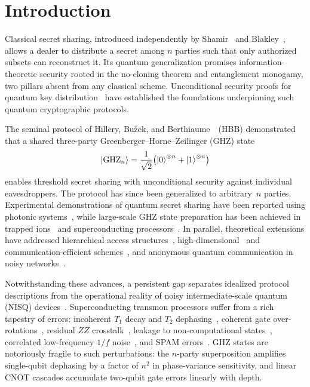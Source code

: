 \documentclass[aip, amsmath, amssymb, preprint, longbibliography]{revtex4-2}
\newcommand{\ghz}{\text{GHZ}}
\begin{document}
\maketitle

\section{Introduction}\label{sec:intro}

Classical secret sharing, introduced independently by Shamir~\cite{Shamir1979}
and Blakley~\cite{Blakley1979}, allows a dealer to distribute a secret among
$n$ parties such that only authorized subsets can reconstruct it. Its quantum
generalization promises information-theoretic security rooted in the
no-cloning theorem and entanglement monogamy, two pillars absent from any
classical scheme. Unconditional security proofs for quantum key
distribution~\cite{Lo1999,Ekert1991} have established the foundations
underpinning such quantum cryptographic protocols.

The seminal protocol of Hillery, Bu\v{z}ek, and
Berthiaume~\cite{Hillery1999}~(HBB) demonstrated that a shared three-party
Greenberger--Horne--Zeilinger (GHZ) state~\cite{Greenberger1989}
\begin{equation}
\ket{\ghz_n} = \frac{1}{\sqrt{2}}
\bigl(\ket{0}^{\otimes n}+\ket{1}^{\otimes n}\bigr)
\label{eq:ghz}
\end{equation}
enables threshold secret sharing with unconditional security against
individual eavesdroppers. The protocol has since been generalized to
arbitrary~$n$ parties. Experimental demonstrations of quantum secret
sharing have been reported using photonic
systems~\cite{Chen2005,Schmid2005,Bell2014,Williams2019,Lu2016},
while large-scale GHZ state preparation has been achieved in
trapped ions~\cite{Monz2011} and superconducting
processors~\cite{Mooney2019,Wei2020}. In parallel, theoretical extensions
have addressed hierarchical access structures~\cite{Qin2020},
high-dimensional~\cite{Tavakoli2015} and communication-efficient
schemes~\cite{Senthoor2019}, and anonymous quantum
communication in noisy networks~\cite{Lipinska2018}.

Notwithstanding these advances, a persistent gap separates idealized
protocol descriptions from the operational reality of noisy
intermediate-scale quantum (NISQ) devices~\cite{Preskill2018,Bharti2022}.
Superconducting transmon processors suffer from a rich tapestry of errors:
incoherent $T_1$ decay and $T_2$ dephasing~\cite{Krantz2019}, coherent
gate over-rotations~\cite{McKay2017}, residual $ZZ$
crosstalk~\cite{Mundada2019,Malekakhlagh2020}, leakage to
non-computational states~\cite{Rol2019,Wood2018}, correlated low-frequency
$1/f$ noise~\cite{Ithier2005,Paladino2014}, and SPAM
errors~\cite{Gambetta2007}. GHZ states are notoriously fragile to such
perturbations: the $n$-party superposition amplifies single-qubit
dephasing by a factor of $n^2$ in phase-variance
sensitivity, and linear CNOT cascades accumulate
two-qubit gate errors linearly with depth.
\end{document}
